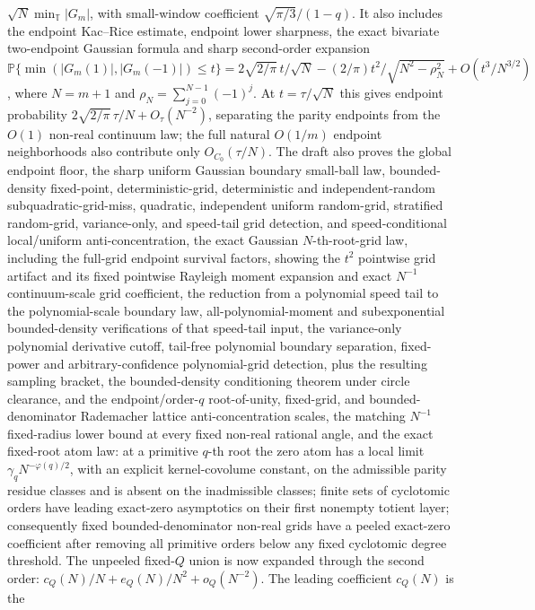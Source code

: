 \documentclass[11pt]{article}
\begin{document}
\(\sqrt N\min_{\mathbb T}|G_m|\), with small-window coefficient
\(\sqrt{\pi/3}/(1-q)\). It also includes the
endpoint Kac--Rice estimate, endpoint lower sharpness, the exact bivariate
two-endpoint Gaussian formula and sharp second-order expansion
\(\mathbb P\{\min(|G_m(1)|,|G_m(-1)|)\le t\}
=2\sqrt{2/\pi}\,t/\sqrt N-(2/\pi)t^2/\sqrt{N^2-\rho_N^2}
+O(t^3/N^{3/2})\), where \(N=m+1\) and
\(\rho_N=\sum_{j=0}^{N-1}(-1)^j\).  At \(t=\tau/\sqrt N\) this gives endpoint
probability \(2\sqrt{2/\pi}\,\tau/N+O_\tau(N^{-2})\), separating the parity
endpoints from the \(O(1)\) non-real continuum law; the full natural
\(O(1/m)\) endpoint neighborhoods also contribute only \(O_{C_0}(\tau/N)\).
The draft also proves the
global endpoint floor, the sharp uniform
Gaussian boundary small-ball law, bounded-density fixed-point,
deterministic-grid, deterministic and independent-random subquadratic-grid-miss,
quadratic, independent uniform random-grid, stratified random-grid, variance-only, and
speed-tail grid detection,
and speed-conditional local/uniform
anti-concentration, the
exact Gaussian \(N\)-th-root-grid law, including the full-grid endpoint
survival factors, showing the \(t^2\) pointwise grid artifact and its
fixed pointwise Rayleigh moment expansion and exact \(N^{-1}\) continuum-scale grid
coefficient, the
reduction from a polynomial speed tail to the polynomial-scale boundary law,
all-polynomial-moment and subexponential bounded-density verifications of that
speed-tail input, the variance-only polynomial derivative cutoff, tail-free
polynomial boundary separation, fixed-power and arbitrary-confidence
polynomial-grid detection, plus the resulting sampling bracket, the
bounded-density conditioning theorem under circle clearance, and the
endpoint/order-\(q\) root-of-unity, fixed-grid, and bounded-denominator
Rademacher lattice anti-concentration scales, the matching \(N^{-1}\)
fixed-radius lower bound at every fixed non-real rational angle, and the exact
fixed-root atom law: at a primitive \(q\)-th root the zero atom has a local
limit \(\gamma_qN^{-\varphi(q)/2}\), with an explicit kernel-covolume constant,
on the admissible parity residue classes and is absent on the inadmissible
classes; finite sets of cyclotomic orders have leading exact-zero asymptotics
on their first nonempty totient layer; consequently fixed bounded-denominator
non-real grids have a peeled exact-zero coefficient after removing all primitive
orders below any fixed cyclotomic degree threshold.  The unpeeled fixed-\(Q\)
union is now expanded through the second order:
\(c_Q(N)/N+e_Q(N)/N^2+o_Q(N^{-2})\).  The leading coefficient \(c_Q(N)\) is the
\end{document}
